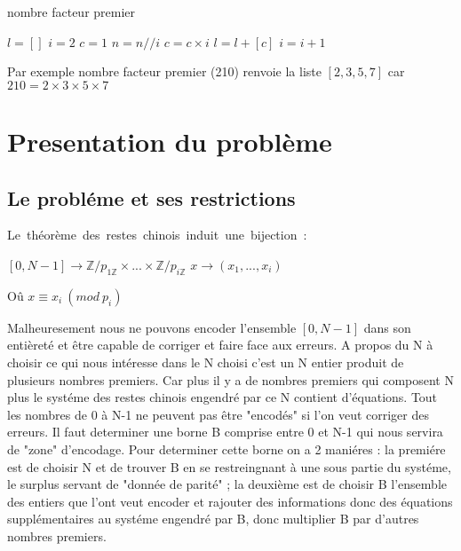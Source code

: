 \documentclass[a4paper, 11pt]{report}
\begin{document}
\begin{algorithm}
    \caption{nombre facteur premier}
    \begin{algorithmic}
        \STATE $l=[]$
        \STATE $i=2$
        \STATE $c=1$
        \STATE $n=n//i$
        \STATE $c=c\times i$
        \ENDWHILE
        \STATE $l=l+\left[c\right] $
        \ENDIF
        \STATE $i=i+1$
        \ENDWHILE
    \end{algorithmic}
\end{algorithm}

Par exemple nombre facteur premier (210) renvoie la liste $[2,3,5,7]$ car $210=2\times 3\times 5\times 7$

\newpage
\chapter{Presentation du problème}
\section{Le probléme et ses restrictions}
\hbox{Le théorème des restes chinois induit une bijection :}
\begin{center}
  

$[0,N-1] \rightarrow \mathbb{Z}/ p_{1 \mathbb{Z}} \times  ... \times   \mathbb{Z}/ p_{i \mathbb{Z}} $  \newline
$x \rightarrow (x_1,...,x_i) $ 

\end{center}

Oû $ x\equiv x_i \: (mod \: p_i)$
\newline

Malheuresement nous ne pouvons encoder l'ensemble $[0,N-1]$ dans son entièreté et être capable de corriger et faire face aux erreurs.\newline
A  propos du N à choisir ce qui nous intéresse dans le N choisi c'est un N entier produit de plusieurs nombres premiers.\newline 
Car plus il y a de nombres premiers qui composent N plus le systéme des restes chinois engendré par ce N contient d'équations.  \newline
Tout les nombres de 0 à N-1 ne peuvent pas être "encodés" si l'on veut corriger des erreurs.\newline
Il faut determiner une borne B comprise entre 0 et N-1 qui nous servira de "zone" d'encodage.\newline
Pour determiner cette borne on a 2 maniéres :\newline
la premiére est de choisir N et de trouver B en se restreingnant à une sous partie du systéme, le surplus servant de "donnée de parité" ;\newline
la deuxième est de choisir B l'ensemble des entiers que l'ont veut encoder et rajouter des informations donc des équations supplémentaires au systéme engendré par B, donc multiplier B par d'autres nombres premiers.\newline
\end{document}
